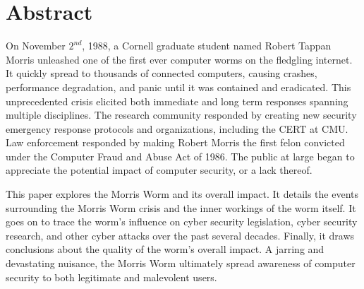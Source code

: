 \section*{Abstract}

On November $2^{nd}$, 1988, a Cornell graduate student named Robert Tappan
Morris unleashed one of the first ever computer worms on the fledgling internet. It
quickly spread to thousands of connected computers, causing crashes, performance
degradation, and panic until it was contained and eradicated. This unprecedented
crisis elicited both immediate and long term responses spanning multiple
disciplines. The research community responded by creating new security
emergency response protocols and organizations, including the CERT
at CMU. Law enforcement responded by making Robert Morris the first felon
convicted under the Computer Fraud and Abuse Act of 1986. The public at large
began to appreciate the potential impact of computer security, or a lack
thereof.

This paper explores the Morris Worm and its overall impact. It details the
events surrounding the Morris Worm crisis and the inner workings of the worm
itself. It goes on to trace the worm's influence on cyber security legislation,
cyber security research, and other cyber attacks over the past several decades.
Finally, it draws conclusions about the quality of the worm's overall impact. A
jarring and devastating nuisance, the Morris Worm ultimately spread awareness
of computer security to both legitimate and malevolent users.
